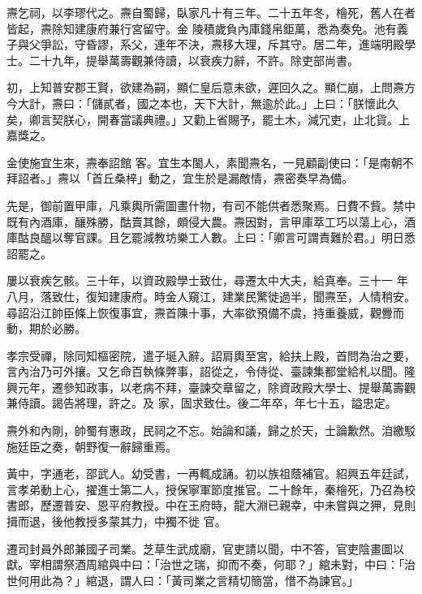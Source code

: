 \begin{pinyinscope}
 燾乞祠，以李璆代之。燾自蜀歸，臥家凡十有三年。二十五年冬，檜死，舊人在者皆起，燾除知建康府兼行宮留守。金
 陵積歲負內庫錢帛鉅萬，悉為奏免。池有義子與父爭訟，守昏謬，系父，連年不決，燾移大理，斥其守。居二年，進端明殿學士。二十九年，提舉萬壽觀兼侍讀，以衰疾力辭，不許。除吏部尚書。



 初，上知普安郡王賢，欲建為嗣，顯仁皇后意未欲，遲回久之。顯仁崩，上問燾方今大計，燾曰：「儲貳者，國之本也，天下大計，無逾於此。」上曰：「朕懷此久矣，卿言契朕心，開春當議典禮。」又勸上省賜予，罷土木，減冗吏，止北貨。上嘉獎之。



 金使施宜生來，燾奉詔館
 客。宜生本閩人，素聞燾名，一見顧副使曰：「是南朝不拜詔者。」燾以「首丘桑梓」動之，宜生於是漏敵情，燾密奏早為備。



 先是，御前置甲庫，凡乘輿所需圖畫什物，有司不能供者悉聚焉。日費不貲。禁中既有內酒庫，釀殊勝，酤賣其餘，頗侵大農。燾因對，言甲庫萃工巧以蕩上心，酒庫酤良醞以奪官課。且乞罷減教坊樂工人數。上曰：「卿言可謂責難於君。」明日悉詔罷之。



 屢以衰疾乞骸。三十年，以資政殿學士致仕，尋遷太中大夫，給真奉。三十一
 年八月，落致仕，復知建康府。時金人窺江，建業民驚徙過半，聞燾至，人情稍安。尋詔沿江帥臣條上恢復事宜，燾首陳十事，大率欲預備不虞，持重養威，觀釁而動，期於必勝。



 孝宗受禪，除同知樞密院，遣子埏入辭。詔肩輿至宮，給扶上殿，首問為治之要，言內治乃可外攘。又乞命百執條弊事，詔從之，令侍從、臺諫集都堂給札以聞。隆興元年，遷參知政事，以老病不拜，臺諫交章留之，除資政殿大學士、提舉萬壽觀兼侍讀。謁告將理，許之。及
 家，固求致仕。後二年卒，年七十五，謚忠定。



 燾外和內剛，帥蜀有惠政，民祠之不忘。始論和議，歸之於天，士論歉然。洎繳駁施廷臣之奏，朝野復一辭歸重焉。



 黃中，字通老，邵武人。幼受書，一再輒成誦。初以族祖蔭補官。紹興五年廷試，言孝弟動上心，擢進士第二人，授保寧軍節度推官。二十餘年，秦檜死，乃召為校書郎，歷遷普安、恩平府教授。中在王府時，龍大淵已親幸，中未嘗與之狎，見則揖而退，後他教授多蒙其力，中獨不徙
 官。



 遷司封員外郎兼國子司業。芝草生武成廟，官吏請以聞，中不答，官吏陰畫圖以獻。宰相謂祭酒周綰與中曰：「治世之瑞，抑而不奏，何耶？」綰未對，中曰：「治世何用此為？」綰退，謂人曰：「黃司業之言精切簡當，惜不為諫官。」




\end{pinyinscope}
